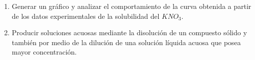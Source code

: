 \documentclass[../main.tex]{subfiles}
\begin{document}
\begin{enumerate}
    \item Generar un gráfico y analizar el comportamiento de la
    curva obtenida a partir de los datos experimentales de la
    solubilidad del $KNO_3$.
    \item Producir soluciones acuosas mediante la disolución 
    de un compuesto sólido y también por medio de la dilución de 
    una solución líquida acuosa que posea mayor concentración.
\end{enumerate}
\end{document}
